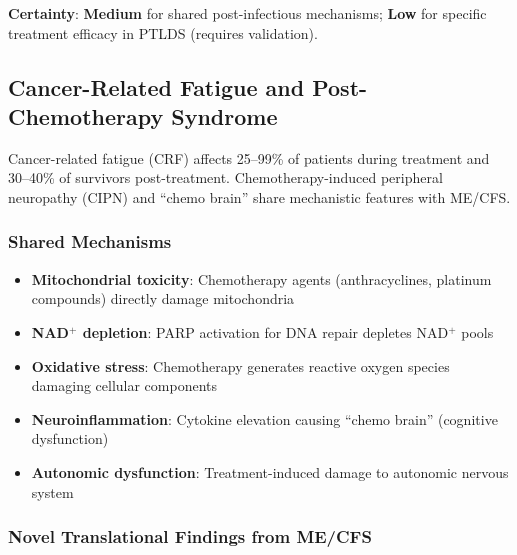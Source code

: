 \textbf{Certainty}: \textbf{Medium} for shared post-infectious mechanisms; \textbf{Low} for specific treatment efficacy in PTLDS (requires validation).

\subsection{Cancer-Related Fatigue and Post-Chemotherapy Syndrome}
\label{sec:cancer-fatigue}

Cancer-related fatigue (CRF) affects 25--99\% of patients during treatment and 30--40\% of survivors post-treatment. Chemotherapy-induced peripheral neuropathy (CIPN) and ``chemo brain'' share mechanistic features with ME/CFS.

\subsubsection{Shared Mechanisms}

\begin{itemize}
    \item \textbf{Mitochondrial toxicity}: Chemotherapy agents (anthracyclines, platinum compounds) directly damage mitochondria
    \item \textbf{NAD$^+$ depletion}: PARP activation for DNA repair depletes NAD$^+$ pools
    \item \textbf{Oxidative stress}: Chemotherapy generates reactive oxygen species damaging cellular components
    \item \textbf{Neuroinflammation}: Cytokine elevation causing ``chemo brain'' (cognitive dysfunction)
    \item \textbf{Autonomic dysfunction}: Treatment-induced damage to autonomic nervous system
\end{itemize}

\subsubsection{Novel Translational Findings from ME/CFS}


